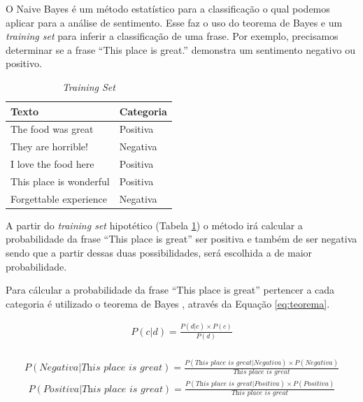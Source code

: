 O Naive Bayes é um método estatístico para a classificação o qual podemos
aplicar para a análise de sentimento. Esse faz o uso do teorema de Bayes e um
\textit{training set} para inferir a classificação de uma frase. Por exemplo,
precisamos determinar se a frase ``This place is great.'' demonstra um
sentimento negativo ou positivo. 

\begin{table}[htb]
\centering
\begin{tabular}{|l|l|}
\hline
Texto  & Categoria \\ \hline
The food was great  & Positiva     \\ \hline
They are horrible!    & Negativa     \\ \hline
I love the food here  & Positiva     \\ \hline
This place is wonderful  & Positiva     \\ \hline
Forgettable experience  & Negativa     \\ \hline
\end{tabular}
\caption{\textit{Training Set}}
\label{tab:trainingsetnb}
\end{table}

A partir do \textit{training set} hipotético (Tabela
\ref{tab:trainingsetnb}) o método irá calcular a probabilidade da frase ``This
place is great'' ser positiva e também de ser negativa sendo que a partir dessas
duas possibilidades, será escolhida a de maior probabilidade.

Para cálcular a probabilidade da frase ``This place is great'' pertencer a cada categoria
é utilizado o teorema de Bayes \cite{manningschutze1999}, através da Equação
\ref{eq:teorema}.

\begin{equation}
\begin{gathered}
P(c|d) = \frac{P(d|c) \times P(c)}{P(d)} \\
\label{eq:teorema}
\end{gathered}
\end{equation}

\begin{equation}
\begin{gathered}
P(Negativa|\textit{This place is great})
=
\frac{P(\textit{This place is great}|Negativa) \times
P(Negativa)}{\textit{This place is great}}
\label{eq:teoreman1}
\end{gathered}
\end{equation}
\begin{equation}
\begin{gathered}
P(Positiva|\textit{This place is great})
=
\frac{P(\textit{This place is great}|Positiva) \times
P(Positiva)}{\textit{This place is great}}
\label{eq:teoremap1}
\end{gathered}
\end{equation}


